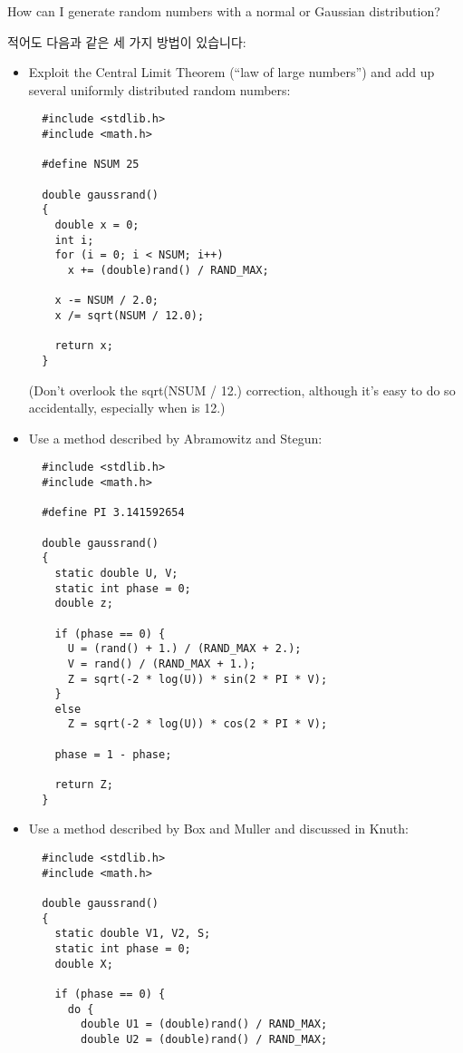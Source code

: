 \begin{faq}
	How can I generate random numbers with a normal or Gaussian
	distribution?

\A
	적어도 다음과 같은 세 가지 방법이 있습니다:

        \begin{itemize}
          \item Exploit the Central Limit Theorem (``law of large numbers'')
            and add up several uniformly distributed random numbers:
\begin{verbatim}
  #include <stdlib.h>
  #include <math.h>

  #define NSUM 25

  double gaussrand()
  {
    double x = 0;
    int i;
    for (i = 0; i < NSUM; i++)
      x += (double)rand() / RAND_MAX;

    x -= NSUM / 2.0;
    x /= sqrt(NSUM / 12.0);

    return x;
  }
\end{verbatim}
	\noindent (Don't overlook the sqrt(NSUM / 12.) correction, although
        it's easy to do so accidentally, especially when  is 12.)

      \item Use a method described by Abramowitz and Stegun:
\begin{verbatim}
  #include <stdlib.h>
  #include <math.h>

  #define PI 3.141592654

  double gaussrand()
  {
    static double U, V;
    static int phase = 0;
    double z;

    if (phase == 0) {
      U = (rand() + 1.) / (RAND_MAX + 2.);
      V = rand() / (RAND_MAX + 1.);
      Z = sqrt(-2 * log(U)) * sin(2 * PI * V);
    }
    else
      Z = sqrt(-2 * log(U)) * cos(2 * PI * V);

    phase = 1 - phase;

    return Z;
  }
\end{verbatim}
      \item Use a method described by Box and Muller and discussed in Knuth:
\begin{verbatim}
  #include <stdlib.h>
  #include <math.h>

  double gaussrand()
  {
    static double V1, V2, S;
    static int phase = 0;
    double X;

    if (phase == 0) {
      do {
        double U1 = (double)rand() / RAND_MAX;
        double U2 = (double)rand() / RAND_MAX;


\end{verbatim}
\end{itemize}
\end{faq}
